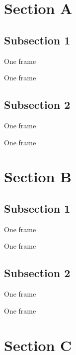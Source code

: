 \documentclass[17pt,t,compress]{beamer}
\begin{document}
\section{Section A}

\subsection{Subsection 1}
\begin{frame}
One frame
\end{frame}

\begin{frame}
One frame
\end{frame}

\subsection{Subsection 2}
\begin{frame}
One frame
\end{frame}

\begin{frame}
One frame
\end{frame}

\section{Section B}

\subsection{Subsection 1}
\begin{frame}
One frame
\end{frame}

\begin{frame}
One frame
\end{frame}


\subsection{Subsection 2}
\begin{frame}
One frame
\end{frame}

\begin{frame}
One frame
\end{frame}



\section{Section C}
\end{document}
